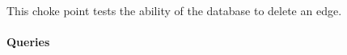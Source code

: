 
This choke point tests the ability of the database to delete an edge.


\paragraph{Queries}
{\raggedright
}